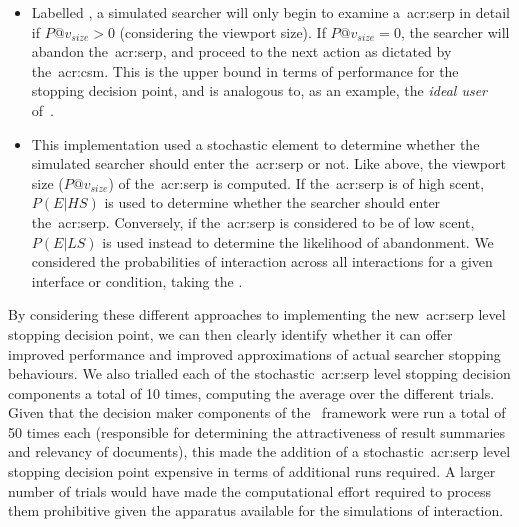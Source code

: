 \begin{itemize}
    \item{ Labelled , a simulated searcher will only begin to examine a~\gls{acr:serp} in detail if $P@v_{size} > 0$ (considering the viewport size). If $P@v_{size} = 0$, the searcher will abandon the~\gls{acr:serp}, and proceed to the next action as dictated by the~\gls{acr:csm}. This is the upper bound in terms of performance for the stopping decision point, and is analogous to, as an example, the \emph{ideal user} of~\cite{hagen2016simulating_users}.}
    
    \item{ This implementation used a stochastic element to determine whether the simulated searcher should enter the~\gls{acr:serp} or not. Like above, the viewport size ($P@v_{size}$) of the~\gls{acr:serp} is computed. If the~\gls{acr:serp} is of high scent, $P(E|HS)$ is used to determine whether the searcher should enter the~\gls{acr:serp}. Conversely, if the~\gls{acr:serp} is considered to be of low scent, $P(E|LS)$ is used instead to determine the likelihood of abandonment. We considered the probabilities of interaction across all interactions for a given interface or condition, taking the .}
    
%
\end{itemize}

By considering these different approaches to implementing the new~\gls{acr:serp} level stopping decision point, we can then clearly identify whether it can offer improved performance and improved approximations of actual searcher stopping behaviours. We also trialled each of the stochastic~\gls{acr:serp} level stopping decision components a total of 10 times, computing the average over the different trials. Given that the decision maker components of the \simiir~framework were run a total of 50 times each (responsible for determining the attractiveness of result summaries and relevancy of documents), this made the addition of a stochastic~\gls{acr:serp} level stopping decision point expensive in terms of additional runs required. A larger number of trials would have made the computational effort required to process them prohibitive given the apparatus available for the simulations of interaction.

